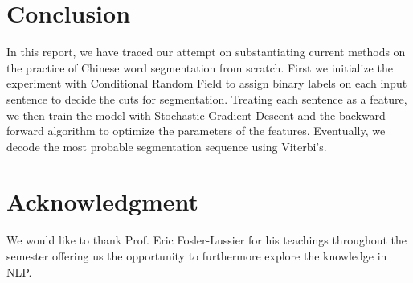 \documentclass[UTF8,11pt]{article}
\begin{document}
\section{Conclusion}
\noindent In this report, we have traced our attempt on substantiating current methods on the practice of Chinese word segmentation from scratch. First we initialize the experiment with Conditional Random Field to assign binary labels on each input sentence to decide the cuts for segmentation. Treating each sentence as a feature, we then train the model with Stochastic Gradient Descent and the backward-forward algorithm to optimize the parameters of the features. Eventually, we decode the most probable segmentation sequence using Viterbi's. 

\section{Acknowledgment}
\noindent We would like to thank Prof. Eric Fosler-Lussier for his teachings throughout the semester offering us the opportunity to furthermore explore the knowledge in NLP.
\end{document}
